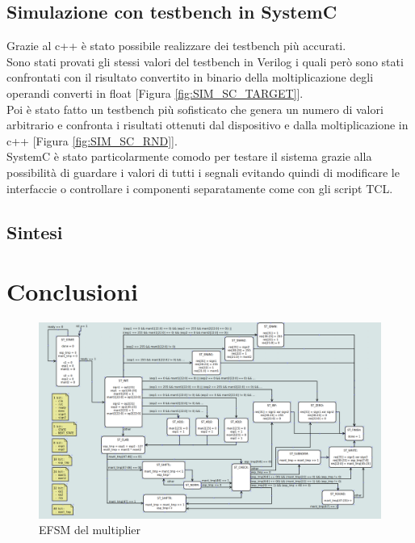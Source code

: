 \documentclass[]{IEEEtran}
\begin{document}
\subsection{Simulazione con testbench in SystemC}
Grazie al c++ è stato possibile realizzare dei testbench più accurati.
\\Sono stati provati gli stessi valori del testbench in Verilog i quali però sono stati confrontati con il risultato convertito in binario della moltiplicazione degli operandi converti in float [Figura \ref{fig:SIM_SC_TARGET}].
\\Poi è stato fatto un testbench più sofisticato che genera un numero di valori arbitrario e confronta i risultati ottenuti dal dispositivo e dalla moltiplicazione in c++ [Figura \ref{fig:SIM_SC_RND}].
\\SystemC è stato particolarmente comodo per testare il sistema grazie alla possibilità di guardare i valori di tutti i segnali evitando quindi di modificare le interfaccie o controllare i componenti separatamente come con gli script TCL.


\subsection{Sintesi}











\section{Conclusioni}

\nocite{*}


\appendix

\begin{figure}[bt]
    \centering
    \includegraphics[width=\textwidth]{figures/EFSM_mult}
    \caption{EFSM del multiplier}
    \label{fig:EFSM_MULT}
\end{figure}
\end{document}
